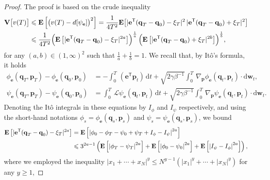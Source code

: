 \documentclass[11pt,a4paper]{article}
\newcommand{\expect}[0]{\mathbf{E}}
\newcommand{\var}[0]{\mathbf{V}}
\newcommand{\grad}{\nabla}
\newcommand{\vect}[1]{\boldsymbol{\mathbf #1}}
\renewcommand{\d}{\mathrm d}
\renewcommand{\t}{\mathsf T}
\theoremstyle{plain}
\numberwithin{equation}{section}
\renewcommand{\leq}{\leqslant}
\renewcommand{\geq}{\geqslant}
\begin{document}
\begin{proof}
    The proof is based on the crude inequality
    \begin{align}
        \notag
        \var \bigl[v(T)\bigr]
        &\leq \expect \left[ \bigl( v(T) - d[\psi_{\vect e}] \bigr)^2 \right]
        = \frac{1}{4 T^2} \expect \big[ \lvert \vect e^\t (\vect q_T - \vect q_0) - \xi_T \rvert^2 \, \lvert \vect e^\t (\vect q_T - \vect q_0) + \xi_T \rvert^2 \big] \\
        \label{eq:bound_variance_two_factors}
        &\leq \frac{1}{4 T^2}
        {\Bigl(\expect \left[  \lvert \vect e^\t(\vect q_T - \vect q_0) - \xi_T \rvert^{2a} \right]\Bigr)^{\frac{1}{a}}} \,
        {\Bigl(\expect \left[ \lvert \vect e^\t (\vect q_T - \vect q_0) + \xi_T \rvert^{2b} \right]\Bigr)^{\frac{1}{b}}},
    \end{align}
    for any $(a, b) \in (1, \infty)^2$ such that $\frac{1}{a} + \frac{1}{b} = 1$.
    We recall that, by It\^o's formula, it holds
    \begin{align*}
        \phi_{\vect e}(\vect q_T, \vect p_T) - \phi_{\vect e}(\vect q_0, \vect p_0)
        &= - \int_{0}^{T} \, (\vect e^\t \vect p_t) \, \d t + \sqrt{2 \gamma \beta^{-1}} \int_{0}^{T} \, \grad_{\vect p} \phi_{\vect e} (\vect q_t, \vect p_t) \cdot \d \vect w_t, \\
        \psi_{\vect e}(\vect q_T, \vect p_T) - \psi_{\vect e}(\vect q_0, \vect p_0)
        &= \int_{0}^{T} \, \mathcal L \psi_{\vect e}(\vect q_t, \vect p_t) \, \d t + \sqrt{2 \gamma \beta^{-1}} \int_{0}^{T} \, \grad_{\vect p} \psi_{\vect e} (\vect q_t, \vect p_t) \cdot \d \vect w_t.
    \end{align*}
    Denoting the It\^o integrals in these equations by $I_{\phi}$ and $I_{\psi}$ respectively,
    and using the short-hand notations $\phi_{s} = \phi_{\vect e}(\vect q_s, \vect p_s)$ and $\psi_{s} = \psi_{\vect e}(\vect q_s, \vect p_s)$,
    we bound
    \begin{align*}
        \expect \left[ |\vect e^\t(\vect q_T - \vect q_0) - \xi_T|^{2 a} \right]
        &= \expect \left[ \abs{\phi_{0} - \phi_{T} - \psi_{0} + \psi_{T}  + I_{\phi} - I_{\psi}}^{2 a} \right] \\
        &\leq 3^{2 a-1} \left( \expect \left[ \abs{\phi_T - \psi_T}^{2 a} \right] + \expect \left[ \abs{\phi_0 - \psi_0}^{2 a} \right] + \expect \left[ \abs{I_{\psi} - I_{\phi}}^{2 a} \right] \right),
    \end{align*}
    where we employed the inequality $|x_1 + \dotsb + x_N|^{y} \leq N^{y-1} \left( |x_1|^y + \dotsb + |x_N|^y \right)$ for any $y \geq 1$,

\end{proof}
\end{document}
